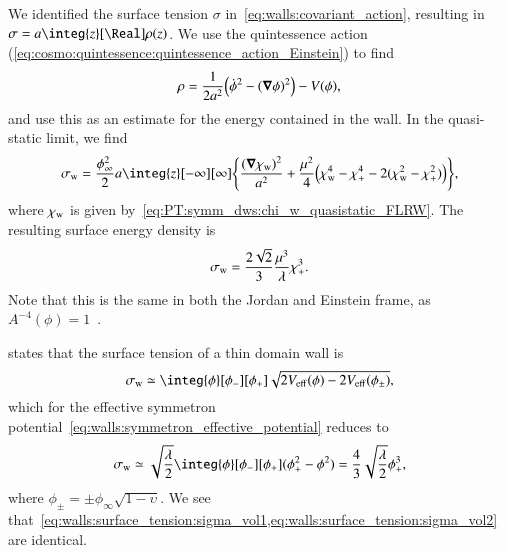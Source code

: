 





We identified the surface tension $\sigma$ in~\cref{eq:walls:covariant_action}, resulting in $\sigma = a \integ{z}[\Real] \rho(z) $. We use the quintessence action (\cref{eq:cosmo:quintessence:quintessence_action_Einstein}) to find~\citep{llinaresDomainWallsCoupled2014}
\begin{align}
    \rho = \frac{1}{2a^2} {\left( \dot{\phi}^2 - {(\boldsymbol{\nabla}\phi)}^2 \right)} - V(\phi),
\end{align}
and use this as an estimate for the energy contained in the wall. %
In the quasi-static limit, we find
\begin{equation}
    \sigma\ped{w} = \frac{\phi_\infty^2 }{2}a \integ{z}[-\infty][\infty] \cclosed{
        \frac{{(\vec{\nabla}\chi\ped{w})}^2}{a^2} + \frac{\mu^2}{4} \pclosed{\chi\ped{w}^4 - \chi_+^4 - 2 (\chi\ped{w}^2-\chi_+^2)}
    },
\end{equation}
where $\chi_\mathrm{w}$ is given by~\cref{eq:PT:symm_dws:chi_w_quasistatic_FLRW}. The resulting surface energy density is 
\begin{equation}\label{eq:walls:surface_tension:sigma_vol1}
    \sigma_\mathrm{w} = \frac{2\sqrt{2}}{3} \frac{\mu^3}{\lambda} \chi_+^3.
\end{equation}
Note that this is the same in both the Jordan and Einstein frame, as $A^{-4}(\phi)=1$~\citep{llinaresDomainWallsCoupled2014}.

\citet{christiansenGravitationalWavesDark2024} states that the surface tension of a thin domain wall is
\begin{equation}\label{eq:walls:surface_tension:sigma_V_eff}
    \sigma\ped{w} \simeq \integ{\phi}[\phi_-][\phi_+] \sqrt{ 2V\ped{eff}(\phi)-2V\ped{eff}(\phi_\pm) },
\end{equation}
which for the effective symmetron potential~\cref{eq:walls:symmetron_effective_potential}
reduces to 
\begin{equation}\label{eq:walls:surface_tension:sigma_vol2}
    \sigma\ped{w} \simeq  \sqrt{\frac{\lambda}{2}}\integ{\phi}[\phi_-][\phi_+]  (\phi_+^2 - \phi^2) = \frac{4}{3}\sqrt{\frac{\lambda}{2}} \phi_+^3,
\end{equation}
where $\phi_\pm = \pm \phi_\infty \sqrt{1-\upsilon}$. We see that~\cref{eq:walls:surface_tension:sigma_vol1,eq:walls:surface_tension:sigma_vol2} are identical.



